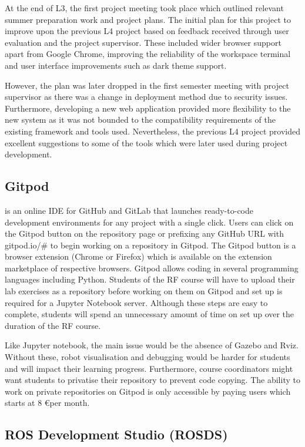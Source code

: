 \documentclass{l4proj}
\begin{document}
At the end of L3, the first project meeting took place which outlined relevant summer preparation work and project plans. The initial plan for this project to improve upon the previous L4 project based on feedback received through user evaluation and the project supervisor. These included wider browser support apart from Google Chrome, improving the reliability of the workspace terminal and user interface improvements such as dark theme support. 

However, the plan was later dropped in the first semester meeting with project supervisor as there was a change in deployment method due to security issues. Furthermore, developing a new web application provided more flexibility to the new system as it was not bounded to the compatibility requirements of the existing framework and tools used. Nevertheless, the previous L4 project provided excellent suggestions to some of the tools which were later used during project development.

\subsection{Gitpod}

\cite{Gitpod} is an online IDE for GitHub and GitLab that launches ready-to-code development environments for any project with a single click. Users can click on the Gitpod button on the repository page or prefixing any GitHub URL with gitpod.io/\# to begin working on a repository in Gitpod. The Gitpod button is a browser extension (Chrome or Firefox) which is available on the extension marketplace of respective browsers. Gitpod allows coding in several programming languages including Python. Students of the RF course will have to upload their lab exercises as a repository before working on them on Gitpod and set up is required for a Jupyter Notebook server. Although these steps are easy to complete, students will spend an unnecessary amount of time on set up over the duration of the RF course.

Like Jupyter notebook, the main issue would be the absence of Gazebo and Rviz. Without these, robot visualisation and debugging would be harder for students and will impact their learning progress. Furthermore, course coordinators might want students to privatise their repository to prevent code copying. The ability to work on private repositories on Gitpod is only accessible by paying users which starts at 8 \euro  per month. 

\subsection{ROS Development Studio (ROSDS)}
\end{document}
